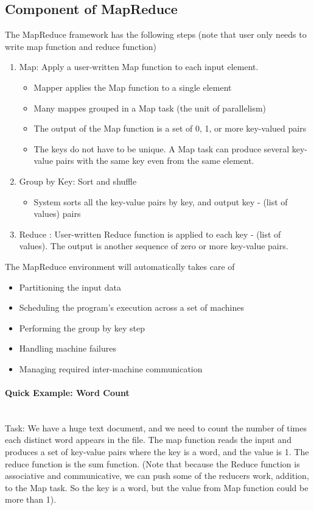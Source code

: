 \subsection{Component of MapReduce} 
The MapReduce framework has the following steps (note that user only needs to write map function and reduce function)
    \begin{enumerate}
        \item Map: Apply a user-written Map function to each input element. 
            \begin{itemize}
                \item Mapper applies the Map function to a single element
                \item Many mappes grouped in a Map task (the unit of parallelism)
                \item The output of the Map function is a set of 0, 1, or more key-valued pairs
                \item The keys do not have to be unique. A Map task can produce several key-value pairs with the same key even from the same element. 
            \end{itemize}
        \item Group by Key: Sort and shuffle 
            \begin{itemize}
                \item System sorts all the key-value pairs by key, and output key - (list of values) pairs
            \end{itemize}
        \item Reduce : User-written Reduce function is applied to each key - (list of values). The output is another sequence of zero or more key-value pairs. 
    \end{enumerate}
The MapReduce environment will automatically takes care of 
    \begin{itemize}
        \item Partitioning the input data
        \item Scheduling the program's execution across a set of machines
        \item Performing the group by key step 
        \item Handling machine failures
        \item Managing required inter-machine communication
    \end{itemize}

\paragraph{Quick Example: Word Count}\mbox{}\\
Task: We have a huge text document, and we need to count the number of times each distinct word appears in the file. The map function reads the input and produces a set of key-value pairs where the key is a word, and the value is 1. The reduce function is the sum function. (Note that because the Reduce function is associative and communicative, we can push some of the reducers work, addition, to the Map task. So the key is a word, but the value from Map function could be more than 1). 



